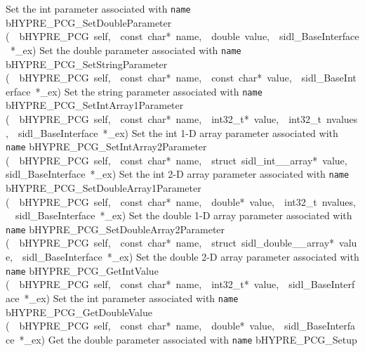 \documentclass{article}
\begin{document}
\begin{cxxentry}
\begin{cxxentry}
\begin{cxxnames}
        {
Set the int parameter associated with {\tt name}}
        {}
\label{cxx.10.1.20}
        {bHYPRE\_PCG\_SetDoubleParameter}
        {(\ \ bHYPRE\_PCG\ self,\ \ const\ char*\ name,\ \ double\ value,\ \ sidl\_BaseInterface\ *\_ex)}
        {
Set the double parameter associated with {\tt name}}
        {}
\label{cxx.10.1.21}
        {bHYPRE\_PCG\_SetStringParameter}
        {(\ \ bHYPRE\_PCG\ self,\ \ const\ char*\ name,\ \ const\ char*\ value,\ \ sidl\_BaseInterface\ *\_ex)}
        {
Set the string parameter associated with {\tt name}}
        {}
\label{cxx.10.1.22}
        {bHYPRE\_PCG\_SetIntArray1Parameter}
        {(\ \ bHYPRE\_PCG\ self,\ \ const\ char*\ name,\ \ int32\_t*\ value,\ \ int32\_t\ nvalues,\ \ sidl\_BaseInterface\ *\_ex)}
        {
Set the int 1-D array parameter associated with {\tt name}}
        {}
\label{cxx.10.1.23}
        {bHYPRE\_PCG\_SetIntArray2Parameter}
        {(\ \ bHYPRE\_PCG\ self,\ \ const\ char*\ name,\ \ struct\ sidl\_int\_\_array*\ value,\ \ sidl\_BaseInterface\ *\_ex)}
        {
Set the int 2-D array parameter associated with {\tt name}}
        {}
\label{cxx.10.1.24}
        {bHYPRE\_PCG\_SetDoubleArray1Parameter}
        {(\ \ bHYPRE\_PCG\ self,\ \ const\ char*\ name,\ \ double*\ value,\ \ int32\_t\ nvalues,\ \ sidl\_BaseInterface\ *\_ex)}
        {
Set the double 1-D array parameter associated with {\tt name}}
        {}
\label{cxx.10.1.25}
        {bHYPRE\_PCG\_SetDoubleArray2Parameter}
        {(\ \ bHYPRE\_PCG\ self,\ \ const\ char*\ name,\ \ struct\ sidl\_double\_\_array*\ value,\ \ sidl\_BaseInterface\ *\_ex)}
        {
Set the double 2-D array parameter associated with {\tt name}}
        {}
\label{cxx.10.1.26}
        {bHYPRE\_PCG\_GetIntValue}
        {(\ \ bHYPRE\_PCG\ self,\ \ const\ char*\ name,\ \ int32\_t*\ value,\ \ sidl\_BaseInterface\ *\_ex)}
        {
Set the int parameter associated with {\tt name}}
        {}
\label{cxx.10.1.27}
        {bHYPRE\_PCG\_GetDoubleValue}
        {(\ \ bHYPRE\_PCG\ self,\ \ const\ char*\ name,\ \ double*\ value,\ \ sidl\_BaseInterface\ *\_ex)}
        {
Get the double parameter associated with {\tt name}}
        {}
\label{cxx.10.1.28}
        {bHYPRE\_PCG\_Setup}

\end{cxxnames}
\end{cxxentry}
\end{cxxentry}
\end{document}
